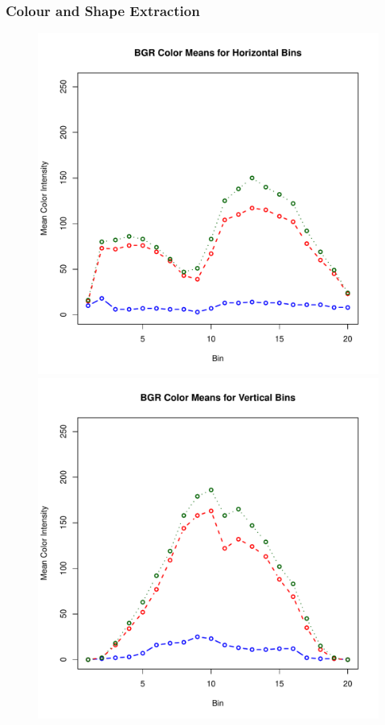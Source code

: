 \documentclass[]{beamer}
\begin{document}
    \begin{frame}[plain]
        \frametitle{Colour and Shape Extraction}

        \begin{figure}[!htb]
              \includegraphics[width=\linewidth]{BGR_means_hor_plot}
            \endminipage\hfill
              \includegraphics[width=\linewidth]{BGR_means_ver_plot}
            \endminipage\hfill
        \end{figure}
    \end{frame}
\end{document}
